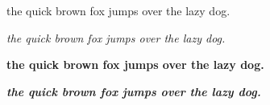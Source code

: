 \documentclass[a4paper,12pt]{scrbook}
\begin{document}
    \par the quick brown fox jumps over the lazy dog.
    \par\textit{the quick brown fox jumps over the lazy dog.}
    \par\textbf{the quick brown fox jumps over the lazy dog.}
    \par\textbf{\textit{the quick brown fox jumps over the lazy dog.}}
\end{document}
